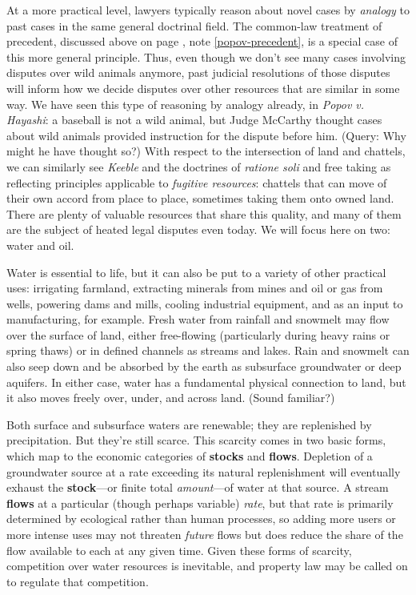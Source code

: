 At a more practical level, lawyers typically reason about novel cases by
\textit{analogy} to past cases in the same general doctrinal field. The
common-law treatment of precedent, discussed above on page
\pageref{popov-precedent}, note \ref{popov-precedent}, is a special case of
this more general principle. Thus, even though we don't see many cases involving
disputes over wild animals anymore, past judicial resolutions of those disputes
will inform how we decide disputes over other resources that are similar in some
way. We have seen this type of reasoning by analogy already, in \textit{Popov v.
Hayashi}: a baseball is not a wild animal, but Judge McCarthy thought cases
about wild animals provided instruction for the dispute before him. (Query: Why
might he have thought so?) With respect to the intersection of land and
chattels, we can similarly see \textit{Keeble} and the doctrines of
\textit{ratione soli} and free taking as reflecting principles applicable to
\textit{fugitive resources}: chattels that can move of their own accord from
place to place, sometimes taking them onto owned land. There are plenty of
valuable resources that share this quality, and many of them are the subject of
heated legal disputes even today. We will focus here on two: water and oil.

Water is essential to life, but it can also be put to a variety of other
practical uses: irrigating farmland, extracting minerals from mines and oil or
gas from wells, powering dams and mills, cooling industrial equipment, and as an
input to manufacturing, for example. Fresh water from rainfall and snowmelt may
flow over the surface of land, either free-flowing (particularly during heavy
rains or spring thaws) or in defined channels as streams and lakes. Rain and
snowmelt can also seep down and be absorbed by the earth as subsurface
groundwater or deep aquifers. In either case, water has a fundamental physical
connection to land, but it also moves freely over, under, and across land.
(Sound familiar?)

Both surface and subsurface waters are renewable; they are replenished by
precipitation. But they're still scarce. This scarcity comes in two basic forms,
which map to the economic categories of \textbf{stocks} and \textbf{flows}.
Depletion of a groundwater source at a rate exceeding its natural replenishment
will eventually exhaust the \textbf{stock}---or finite total
\textit{amount}---of water at that source. A stream \textbf{flows} at a
particular (though perhaps variable) \textit{rate}, but that rate is primarily
determined by ecological rather than human processes, so adding more users or
more intense uses may not threaten \textit{future} flows but does reduce the
share of the flow available to each at any given time. Given these forms of
scarcity, competition over water resources is inevitable, and property law may
be called on to regulate that competition.

